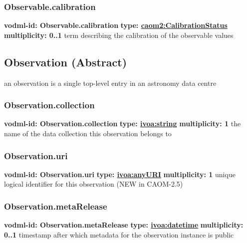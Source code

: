     \subsubsection{Observable.calibration}
      \textbf{vodml-id: Observable.calibration} \newline
      \textbf{type: \hyperref[sect:CalibrationStatus]{caom2:CalibrationStatus}} \newline
      \textbf{multiplicity: 0..1} \newline
      term describing the calibration of the observable values

  \subsection{Observation (Abstract)}
  \label{sect:Observation}
    an observation is a single top-level entry in an astronomy data centre

    \subsubsection{Observation.collection}
      \textbf{vodml-id: Observation.collection} \newline
      \textbf{type: \hyperref[sect:ivoa]{ivoa:string}} \newline
      \textbf{multiplicity: 1} \newline
      the name of the data collection this observation belongs to

    \subsubsection{Observation.uri}
      \textbf{vodml-id: Observation.uri} \newline
      \textbf{type: \hyperref[sect:ivoa]{ivoa:anyURI}} \newline
      \textbf{multiplicity: 1} \newline
      unique logical identifier for this observation (NEW in CAOM-2.5)

    \subsubsection{Observation.metaRelease}
      \textbf{vodml-id: Observation.metaRelease} \newline
      \textbf{type: \hyperref[sect:ivoa]{ivoa:datetime}} \newline
      \textbf{multiplicity: 0..1} \newline
      timestamp after which metadata for the observation instance is public


